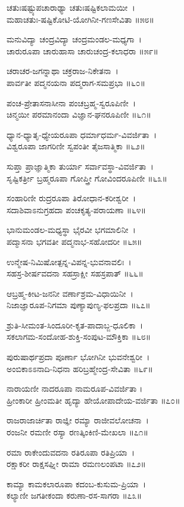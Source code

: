 ಚತುಃಷಷ್ಟ್ಯುಪಚಾರಾಢ್ಯಾ ಚತುಃಷಷ್ಟಿಕಲಾಮಯೀ~।\\
ಮಹಾಚತುಃ-ಷಷ್ಟಿಕೋಟಿ-ಯೋಗಿನೀ-ಗಣಸೇವಿತಾ ॥೫೮॥

ಮನುವಿದ್ಯಾ ಚಂದ್ರವಿದ್ಯಾ ಚಂದ್ರಮಂಡಲ-ಮಧ್ಯಗಾ~।\\
ಚಾರುರೂಪಾ ಚಾರುಹಾಸಾ ಚಾರುಚಂದ್ರ-ಕಲಾಧರಾ ॥೫೯॥

ಚರಾಚರ-ಜಗನ್ನಾಥಾ ಚಕ್ರರಾಜ-ನಿಕೇತನಾ~।\\
ಪಾರ್ವತೀ ಪದ್ಮನಯನಾ ಪದ್ಮರಾಗ-ಸಮಪ್ರಭಾ ॥೬೦॥

ಪಂಚ-ಪ್ರೇತಾಸನಾಸೀನಾ ಪಂಚಬ್ರಹ್ಮ-ಸ್ವರೂಪಿಣೀ~।\\
ಚಿನ್ಮಯೀ ಪರಮಾನಂದಾ ವಿಜ್ಞಾನ-ಘನರೂಪಿಣೀ ॥೬೧॥

ಧ್ಯಾನ-ಧ್ಯಾತೃ-ಧ್ಯೇಯರೂಪಾ ಧರ್ಮಾಧರ್ಮ-ವಿವರ್ಜಿತಾ~।\\
ವಿಶ್ವರೂಪಾ ಜಾಗರಿಣೀ ಸ್ವಪಂತೀ ತೈಜಸಾತ್ಮಿಕಾ ॥೬೨॥

ಸುಪ್ತಾ ಪ್ರಾಜ್ಞಾತ್ಮಿಕಾ ತುರ್ಯಾ ಸರ್ವಾವಸ್ಥಾ-ವಿವರ್ಜಿತಾ~।\\
ಸೃಷ್ಟಿಕರ್ತ್ರೀ ಬ್ರಹ್ಮರೂಪಾ ಗೋಪ್ತ್ರೀ ಗೋವಿಂದರೂಪಿಣೀ ॥೬೩॥

ಸಂಹಾರಿಣೀ ರುದ್ರರೂಪಾ ತಿರೋಧಾನ-ಕರೀಶ್ವರೀ~।\\
ಸದಾಶಿವಾಽನುಗ್ರಹದಾ ಪಂಚಕೃತ್ಯ-ಪರಾಯಣಾ ॥೬೪॥

ಭಾನುಮಂಡಲ-ಮಧ್ಯಸ್ಥಾ ಭೈರವೀ ಭಗಮಾಲಿನೀ~।\\
ಪದ್ಮಾಸನಾ ಭಗವತೀ ಪದ್ಮನಾಭ-ಸಹೋದರೀ ॥೬೫॥

ಉನ್ಮೇಷ-ನಿಮಿಷೋತ್ಪನ್ನ-ವಿಪನ್ನ-ಭುವನಾವಲಿಃ~।\\
ಸಹಸ್ರ-ಶೀರ್ಷವದನಾ ಸಹಸ್ರಾಕ್ಷೀ ಸಹಸ್ರಪಾತ್ ॥೬೬॥

ಆಬ್ರಹ್ಮ-ಕೀಟ-ಜನನೀ ವರ್ಣಾಶ್ರಮ-ವಿಧಾಯಿನೀ~।\\
ನಿಜಾಜ್ಞಾರೂಪ-ನಿಗಮಾ ಪುಣ್ಯಾಪುಣ್ಯ-ಫಲಪ್ರದಾ ॥೬೭॥

ಶ್ರುತಿ-ಸೀಮಂತ-ಸಿಂದೂರೀ-ಕೃತ-ಪಾದಾಬ್ಜ-ಧೂಲಿಕಾ~।\\
ಸಕಲಾಗಮ-ಸಂದೋಹ-ಶುಕ್ತಿ-ಸಂಪುಟ-ಮೌಕ್ತಿಕಾ ॥೬೮॥

ಪುರುಷಾರ್ಥಪ್ರದಾ ಪೂರ್ಣಾ ಭೋಗಿನೀ ಭುವನೇಶ್ವರೀ~।\\
ಅಂಬಿಕಾಽಽನಾದಿ-ನಿಧನಾ ಹರಿಬ್ರಹ್ಮೇಂದ್ರ-ಸೇವಿತಾ ॥೬೯॥

ನಾರಾಯಣೀ ನಾದರೂಪಾ ನಾಮರೂಪ-ವಿವರ್ಜಿತಾ ।\\
ಹ್ರೀಂಕಾರೀ ಹ್ರೀಂಮತೀ ಹೃದ್ಯಾ ಹೇಯೋಪಾದೇಯ-ವರ್ಜಿತಾ ॥೭೦॥

ರಾಜರಾಜಾರ್ಚಿತಾ ರಾಜ್ಞೀ ರಮ್ಯಾ ರಾಜೀವಲೋಚನಾ~।\\
ರಂಜನೀ ರಮಣೀ ರಸ್ಯಾ ರಣತ್ಕಿಂಕಿಣಿ-ಮೇಖಲಾ ॥೭೧॥

ರಮಾ ರಾಕೇಂದುವದನಾ ರತಿರೂಪಾ ರತಿಪ್ರಿಯಾ~।\\
ರಕ್ಷಾಕರೀ ರಾಕ್ಷಸಘ್ನೀ ರಾಮಾ ರಮಣಲಂಪಟಾ ॥೭೨॥

ಕಾಮ್ಯಾ ಕಾಮಕಲಾರೂಪಾ ಕದಂಬ-ಕುಸುಮ-ಪ್ರಿಯಾ~।\\
ಕಲ್ಯಾಣೀ ಜಗತೀಕಂದಾ ಕರುಣಾ-ರಸ-ಸಾಗರಾ ॥೭೩॥

